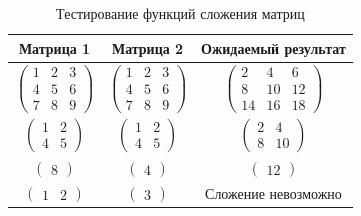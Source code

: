 \begin{table}[hb]
    \caption{\centering Тестирование функций сложения матриц}
    \centering
    \begin{tabular}{ccc}
    Матрица 1 & Матрица 2 & Ожидаемый результат \\ \hline
    $\begin{pmatrix}
        1 & 2 & 3 \\
        4 & 5 & 6 \\
        7 & 8 & 9
    \end{pmatrix}$
    &$\begin{pmatrix}
        1 & 2 & 3 \\
        4 & 5 & 6 \\
        7 & 8 & 9
    \end{pmatrix}$
    &$\begin{pmatrix}
        2 & 4 & 6 \\
        8 & 10 & 12 \\
        14 & 16 & 18
    \end{pmatrix}$\\
    $\begin{pmatrix}
        1 & 2 \\
        4 & 5
    \end{pmatrix}$
    &$\begin{pmatrix}
        1 & 2 \\
        4 & 5
    \end{pmatrix}$
    &$\begin{pmatrix}
        2 & 4 \\
        8 & 10
    \end{pmatrix}$\\
    $\begin{pmatrix}
        8
    \end{pmatrix}$
    &$\begin{pmatrix}
        4
    \end{pmatrix}$
    &$\begin{pmatrix}
        12
    \end{pmatrix}$\\
    $\begin{pmatrix} 1 & 2 \end{pmatrix}$ & $\begin{pmatrix} 3 \end{pmatrix}$ & Сложение невозможно
    \end{tabular}
    \label{tab:tests}
    \end{table}

